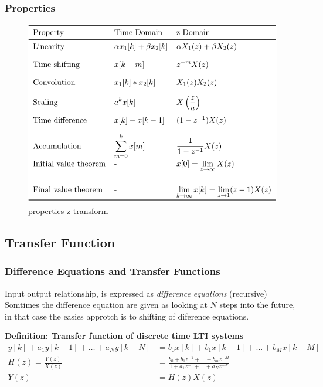 \documentclass{article}
\begin{document}
\newpage
\subsubsection{Properties}
\begin{figure}[!h]
    \centering
    \includegraphics[width=12cm]{image/properties_z-transform.png}
    \caption{properties z-transform}
    \label{fig:properties_z-transform}
\end{figure}


\subsection{Transfer Function}
\subsubsection{Difference Equations and Transfer Functions}
Input output relationship, is expressed as \textit{difference equations} (recursive)
Somtimes the difference equation are given as looking at $N$ steps into 
the future, in that case the easies approtch is to shifting of diference equations.

\textbf{Definition: Transfer function of discrete time LTI systems}
\begin{align*}
    y[k]+a_1y[k-1]+\ldots+a_N y[k-N] &= b_0 x[k]+b_1 x[k-1]+\ldots+b_M x[k-M] \\ 
    H(z) = \frac{Y(z)}{X(z)} &= \frac{b_0+b_1z^{-1}+\ldots+b_mz^{-M}}{1+a_1z^{-1}+\ldots+a_Nz^{-N}} \\
    Y(z) &= H(z)X(z)
\end{align*}
\end{document}
